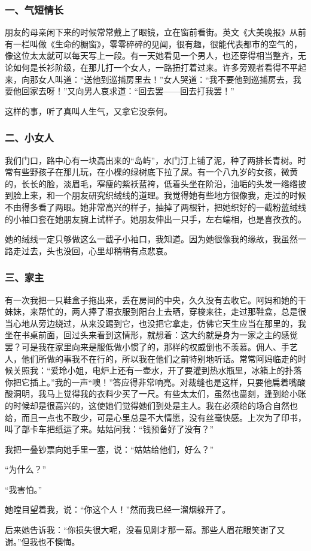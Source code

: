 \subsubsection*{一、气短情长}
\par 朋友的母亲闲下来的时候常常戴上了眼镜，立在窗前看街。英文《大美晚报》从前有一栏叫做《生命的橱窗》，零零碎碎的见闻，很有趣，很能代表都市的空气的，像这位太太就可以每天写上一段。有一天她看见一个男人，也还穿得相当整齐，无论如何是长衫阶级，在那儿打一个女人，一路扭打着过来。许多旁观者看得不平起来，向那女人叫道：“送他到巡捕房里去！”女人哭道：“我不要他到巡捕房去，我要他回家去呀！”又向男人哀求道：“回去罢——回去打我罢！”
\par 这样的事，听了真叫人生气，又拿它没奈何。
\subsubsection*{二、小女人}
\par 我们门口，路中心有一块高出来的“岛屿”，水门汀上铺了泥，种了两排长青树。时常有些野孩子在那儿玩，在小棵的绿树底下拉了屎。有一个八九岁的女孩，微黄的，长长的脸，淡眉毛，窄瘦的紫袄蓝袴，低着头坐在阶沿，油垢的头发一绺绺披到脸上来，和一个朋友研究织绒线的道理。我觉得她有些地方很像我，走过的时候不由得多看了两眼。她非常高兴的样子，抽掉了两根针，把她织好的一截粉蓝绒线的小袖口套在她朋友腕上试样子。她朋友伸出一只手，左右端相，也是喜孜孜的。
\par 她的绒线一定只够做这么一截子小袖口，我知道。因为她很像我的缘故，我虽然一路走过去，头也没回，心里却稍稍有点悲哀。
\subsubsection*{三、家主}
\par 有一次我把一只鞋盒子拖出来，丢在房间的中央，久久没有去收它。阿妈和她的干妹妹，来帮忙的，两人捧了湿衣服到阳台上去晒，穿梭来往，走过那鞋盒，总是很当心地从旁边绕过，从来没踢到它，也没把它拿走，仿佛它天生应当在那里的，我坐在书桌前面，回过头来看到这情形，就想着：这大约就是身为一家之主的感觉罢？可是我在家里向来是服低做小惯了的，那样的权威倒也不羡慕。佣人、手艺人，他们所做的事我不在行的，所以我在他们之前特别地听话。常常阿妈临走的时候关照我：“爱玲小姐，电炉上还有一壶水，开了要灌到热水瓶里，冰箱上的扑落你把它插上。”我的一声“噢！”答应得非常响亮。对裁缝也是这样，只要他扁着嘴酸酸洞明，我马上觉得我的衣料少买了一尺。有些太太们，虽然也啬刻，逢到给小账的时候却是很高兴的，这使她们觉得她们到处是主人。我在必须给的场合自然也给，而且一点也不敢少，可是心里总是不大情愿，没有丝毫快感。上次为了印书，叫了部卡车把纸运了来。姑姑问我：“钱预备好了没有？”
\par 我把一叠钞票向她手里一塞，说：“姑姑给他们，好么？”
\par “为什么？”
\par “我害怕。”
\par 她瞠目望着我，说：“你这个人！”然而我已经一溜烟躲开了。
\par 后来她告诉我：“你损失很大呢，没看见刚才那一幕。那些人眉花眼笑谢了又谢。”但我也不懊悔。
